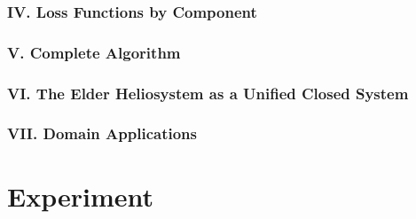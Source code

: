 \documentclass[11pt,twoside]{book}
\begin{document}
\section*{IV. Loss Functions by Component}

\section*{V. Complete Algorithm}

\section*{VI. The Elder Heliosystem as a Unified Closed System}

\section*{VII. Domain Applications}

\part{Experiment}



\backmatter
\printbibliography[title={References}]
\end{document}
